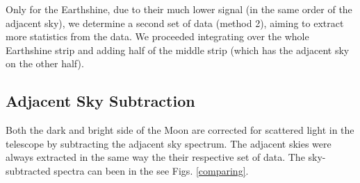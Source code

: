 Only for the Earthshine, due
to their much lower signal (in the same order of the adjacent sky), we determine
a second set of data (method 2), aiming to extract more statistics from the
data. We proceeded integrating over the whole
Earthshine strip and adding half of the middle strip (which has the adjacent
sky on the other half).





\subsection{Adjacent Sky Subtraction}
Both the dark and bright side of the Moon are corrected for scattered
light in the telescope by subtracting the adjacent sky spectrum. The adjacent
skies were always extracted in the same way the their respective set of data. The
sky-subtracted spectra can been in the see Figs. \ref{comparing}. 



